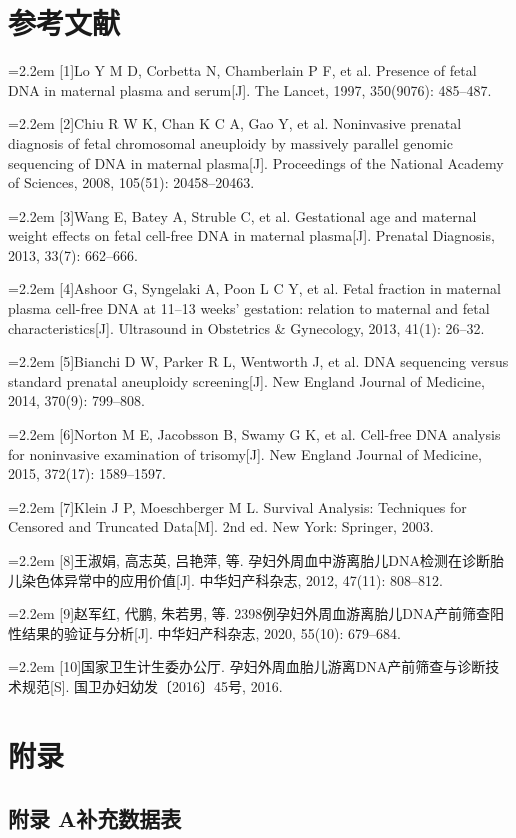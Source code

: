 \documentclass[UTF8,fontset=fandol,zihao=-4,a4paper]{ctexart}
\newcommand{\refitem}[2]{\par\noindent\hangindent=2.2em\hangafter=1 [#1]\hspace{0.6em}#2\par\vspace{2pt}}
\begin{document}
\setcounter{page}{38}

\section*{参考文献}

\refitem{1}{Lo Y M D, Corbetta N, Chamberlain P F, et al. Presence of fetal DNA in maternal plasma and serum[J]. The Lancet, 1997, 350(9076): 485--487.}
\refitem{2}{Chiu R W K, Chan K C A, Gao Y, et al. Noninvasive prenatal diagnosis of fetal chromosomal aneuploidy by massively parallel genomic sequencing of DNA in maternal plasma[J]. Proceedings of the National Academy of Sciences, 2008, 105(51): 20458--20463.}
\refitem{3}{Wang E, Batey A, Struble C, et al. Gestational age and maternal weight effects on fetal cell-free DNA in maternal plasma[J]. Prenatal Diagnosis, 2013, 33(7): 662--666.}
\refitem{4}{Ashoor G, Syngelaki A, Poon L C Y, et al. Fetal fraction in maternal plasma cell-free DNA at 11--13 weeks' gestation: relation to maternal and fetal characteristics[J]. Ultrasound in Obstetrics \& Gynecology, 2013, 41(1): 26--32.}
\refitem{5}{Bianchi D W, Parker R L, Wentworth J, et al. DNA sequencing versus standard prenatal aneuploidy screening[J]. New England Journal of Medicine, 2014, 370(9): 799--808.}
\refitem{6}{Norton M E, Jacobsson B, Swamy G K, et al. Cell-free DNA analysis for noninvasive examination of trisomy[J]. New England Journal of Medicine, 2015, 372(17): 1589--1597.}
\refitem{7}{Klein J P, Moeschberger M L. Survival Analysis: Techniques for Censored and Truncated Data[M]. 2nd ed. New York: Springer, 2003.}
\refitem{8}{王淑娟, 高志英, 吕艳萍, 等. 孕妇外周血中游离胎儿DNA检测在诊断胎儿染色体异常中的应用价值[J]. 中华妇产科杂志, 2012, 47(11): 808--812.}
\refitem{9}{赵军红, 代鹏, 朱若男, 等. 2398例孕妇外周血游离胎儿DNA产前筛查阳性结果的验证与分析[J]. 中华妇产科杂志, 2020, 55(10): 679--684.}
\refitem{10}{国家卫生计生委办公厅. 孕妇外周血胎儿游离DNA产前筛查与诊断技术规范[S]. 国卫办妇幼发〔2016〕45号, 2016.}

\clearpage
\section*{附录}

\subsection*{附录 A\hspace{1em}补充数据表}
\renewcommand{\thetable}{A.\arabic{table}}
\end{document}
